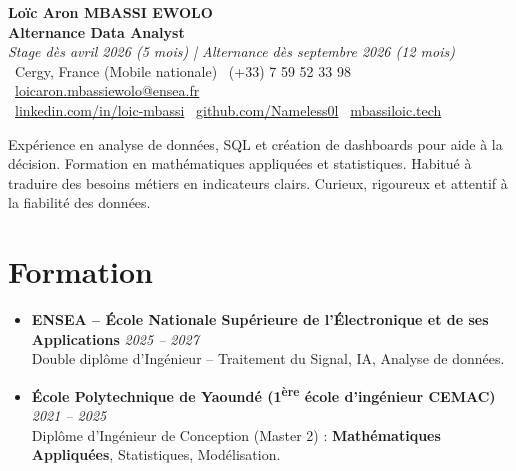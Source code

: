\documentclass[a4paper,11pt]{article}
\begin{document}
\begin{center}
    {\Large \textbf{Loïc Aron MBASSI EWOLO}} \\ \vspace{4pt}
    \textbf{\large Alternance Data Analyst} \\
    \textit{\small Stage dès avril 2026 (5 mois) | Alternance dès septembre 2026 (12 mois)} \\ \vspace{4pt}
    \small
    \faMapMarker\ Cergy, France (Mobile nationale) \quad
    \faPhone\ (+33) 7 59 52 33 98 \quad
    {\color{primary}\faEnvelope\ \href{mailto:loicaron.mbassiewolo@ensea.fr}{loicaron.mbassiewolo@ensea.fr}} \\ \vspace{2pt}
    {\color{primary}\faLinkedin\ \href{https://www.linkedin.com/in/loic-mbassi/}{linkedin.com/in/loic-mbassi}} \quad
    {\color{primary}\faGithub\ \href{https://github.com/Nameless0l}{github.com/Nameless0l}} \quad
    {\color{primary}\faGlobe\ \href{https://mbassiloic.tech}{mbassiloic.tech}}
\end{center}

\vspace{-6pt}

\noindent\small{Expérience en analyse de données, SQL et création de dashboards pour aide à la décision. Formation en mathématiques appliquées et statistiques. Habitué à traduire des besoins métiers en indicateurs clairs. Curieux, rigoureux et attentif à la fiabilité des données.}

\section{Formation}
\begin{itemize}[leftmargin=*, label=\tiny$\bullet$, nosep]
    \item \textbf{ENSEA -- École Nationale Supérieure de l'Électronique et de ses Applications} \hfill \textit{2025 -- 2027} \\
    \small{Double diplôme d'Ingénieur -- Traitement du Signal, IA, Analyse de données.}
    \item \textbf{École Polytechnique de Yaoundé (1\textsuperscript{ère} école d'ingénieur CEMAC)} \hfill \textit{2021 -- 2025} \\
    \small{Diplôme d'Ingénieur de Conception (Master 2) : \textbf{Mathématiques Appliquées}, Statistiques, Modélisation.}
\end{itemize}
\end{document}
